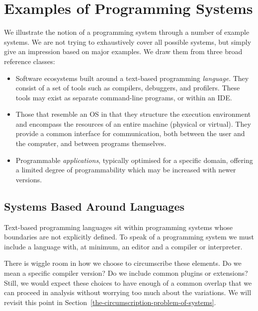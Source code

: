 \documentclass[ twoside,openright,titlepage,numbers=noenddot,headinclude,footinclude,cleardoublepage=empty,abstract=on,
                BCOR=5mm,paper=a4,fontsize=11pt
                ]{scrreprt}
\newcommand{\joel}[1]{}
\providecommand{\tightlist}{}\newenvironment{longtable}[2]{\begin{tabular}}{\end{tabular}}
\theoremstyle{definition}
\begin{document}
\hypertarget{examples-of-programming-systems}{\section{Examples of Programming
Systems}\label{examples-of-programming-systems}}

We illustrate the notion of a programming system through a number of
example systems. We are not trying to exhaustively cover all possible
systems, but simply give an impression based on major examples. We draw
them from three broad reference classes:

\begin{itemize}
\tightlist
\item
  Software ecosystems built around a text-based programming
  \emph{language}. They consist of a set of tools such as compilers,
  debuggers, and profilers. These tools may exist as separate
  command-line programs, or within an \ac{IDE}.
\item
  Those that resemble an \ac{OS} in that they structure the execution
  environment and encompass the resources of an entire machine (physical
  or virtual). They provide a common interface for communication, both
  between the user and the computer, and between programs themselves.
\item
  Programmable \emph{applications}, typically optimised for a specific
  domain, offering a limited degree of programmability which may be
  increased with newer versions.
\end{itemize}

\joel{
We will proceed to detail some systems under this grouping. This will provide an intuition for the notion of a programming system and establish a collection of go-to examples for the rest of the paper.}

\hypertarget{systems-based-around-languages}{\subsection{Systems Based Around
Languages}\label{systems-based-around-languages}}

Text-based programming languages sit within programming systems whose
boundaries are not explicitly defined. To speak of a programming system
we must include a language with, at minimum, an editor and a compiler or
interpreter.

There is wiggle room in how we choose to circumscribe these elements. Do
we mean a specific compiler version? Do we include common plugins or
extensions? Still, we would expect these choices to have enough of a
common overlap that we can proceed in analysis without worrying too much
about the variations. We will revisit this point in
Section~\ref{the-circumscription-problem-of-systems}.
\end{document}
